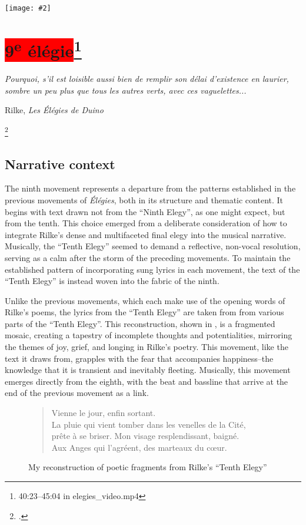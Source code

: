 \documentclass[12pt,twoside,maitrise]{dms_ks}
\newcommand{\customincludeexamples}[4][]{%
    \begin{example}[H]
        \centering
        \texttt{[image: \#2]}
        \caption{#4}
	\label{#3} 
    \end{example}
}
\theoremstyle{definition}
\begin{document}
{\customincludeexamples[width=\textwidth]{8e_3}{ex:8e_3}{The voice singing subharmonics against the bed track as well as the entry of the bassline over the beat (mm. 31-38).}

\section{\colorbox{red}{9\textsuperscript{e} élégie}\footnote{40:23--45:04 in elegies\_video.mp4}}

\epigraph{\textit{Pourquoi, s’il est loisible aussi bien de remplir son délai d’existence en laurier, sombre un peu plus que tous les autres verts, avec ces vaguelettes...}}{Rilke, \textit{Les Élégies de Duino}\protect\footnotemark}

\footcitetext[83]{rilke_egies_1986}

\subsection{Narrative context}

The ninth movement represents a departure from the patterns established in the previous movements of \textit{Élégies}, both in its structure and thematic content. 
It begins with text drawn not from the “Ninth Elegy”, as one might expect, but from the tenth. 
This choice emerged from a deliberate consideration of how to integrate Rilke’s dense and multifaceted final elegy into the musical narrative. 
Musically, the “Tenth Elegy” seemed to demand a reflective, non-vocal resolution, serving as a calm after the storm of the preceding movements. 
To maintain the established pattern of incorporating sung lyrics in each movement, the text of the “Tenth Elegy” is instead woven into the fabric of the ninth.

Unlike the previous movements, which each make use of the opening words of Rilke's poems, the lyrics from the “Tenth Elegy” are taken from from various parts of the “Tenth Elegy”. 
This reconstruction, shown in , is a fragmented mosaic, creating a tapestry of incomplete thoughts and potentialities, mirroring the themes of joy, grief, and longing in Rilke’s poetry. 
This movement, like the text it draws from, grapples with the fear that accompanies happiness--the knowledge that it is transient and inevitably fleeting. 
Musically, this movement emerges directly from the eighth, with the beat and bassline that arrive at the end of the previous movement as a link.

\begin{figure}[H]
\begin{verse}
Vienne le jour, enfin sortant.\\ 
La pluie qui vient tomber dans les venelles de la Cité,\\ 
prête à se briser. Mon visage resplendissant, baigné.\\ 
Aux Anges qui l'agréent, des marteaux du cœur.\\
\end{verse}  
	\caption{My reconstruction of poetic fragments from Rilke's “Tenth Elegy”} 
\label{fig:poem}
\end{figure}

}
\end{document}
